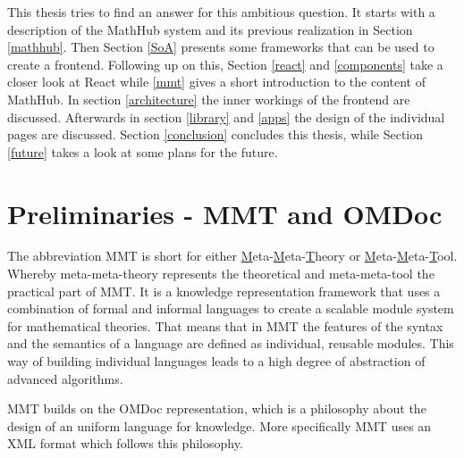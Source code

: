 \documentclass[11pt,a4paper]{article}
\begin{document}
This thesis tries to find an answer for this ambitious question. It starts with a description of the MathHub system and its previous realization in Section \ref{mathhub}.
Then Section \ref{SoA} presents some frameworks that can be used to create a frontend.
Following up on this, Section \ref{react} and \ref{components} take a closer look at React while \ref{mmt} gives a short introduction to the content of MathHub.
In section \ref{architecture} the inner workings of the frontend are discussed.
Afterwards in section \ref{library} and \ref{apps} the design of the individual pages are discussed.
Section \ref{conclusion} concludes this thesis, while Section \ref{future} takes a look at some plans for the future.

\section{Preliminaries - MMT and OMDoc} \label{preliminaries}
The abbreviation MMT is short for either \underline{M}eta-\underline{M}eta-\underline{T}heory or \underline{M}eta-\underline{M}eta-\underline{T}ool.
Whereby meta-meta-theory represents the theoretical and meta-meta-tool the practical part of MMT.
It is a knowledge representation framework that uses a combination of formal and informal languages to create a scalable module system for mathematical theories.
That means that in MMT the features of the syntax and the semantics of a language are defined as individual, reusable modules.
This way of building individual languages leads to a high degree of abstraction of advanced algorithms.\cite{mmtsys}

MMT builds on the OMDoc representation, which is a philosophy about the design of an uniform language for knowledge.
More specifically MMT uses an XML format which follows this philosophy.
\end{document}
